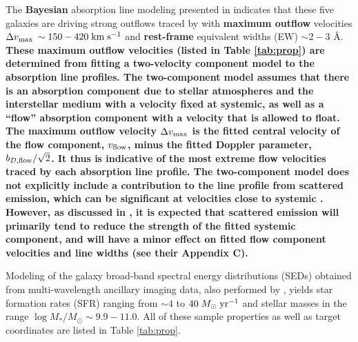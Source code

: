 \documentclass[trackchanges,twocolumn]{aastex62}
\def \mkms {{\rm \; km\;s^{-1}}}
\def \msunperyr {{\; M_{\odot}\rm \;yr^{-1}}}
\begin{document}
The \textbf{Bayesian} absorption line modeling presented in \cite{Rubin_2014} indicates that these five galaxies are driving strong outflows traced by  with \textbf{maximum outflow} velocities $\Delta v_{\rm max}$ $\sim150-420\mkms$ and \textbf{rest-frame} equivalent widths (EW) $\sim 2-3$ \AA. \textbf{These maximum outflow velocities (listed in Table \ref{tab:prop}) are determined from fitting a two-velocity component model to the absorption line profiles. The two-component model assumes that there is an absorption component due to stellar atmospheres and the interstellar medium with a velocity fixed at systemic, as well as a ``flow'' absorption component with a velocity that is allowed to float.  %
The maximum outflow velocity $\Delta v_{\rm max}$ is the fitted central velocity of the flow component, $v_{\rm flow}$, minus the fitted Doppler parameter, $b_{D,\rm flow}/\sqrt{2}$.  It thus is indicative of the most extreme flow velocities traced by each absorption line profile.
The two-component model does not explicitly include a contribution to the line profile from scattered emission, which
can be significant at velocities close to systemic \citep{Prochaska_2011}.  However, as discussed in \cite{Rubin_2014}, it is expected that scattered emission will primarily tend to reduce the strength of the fitted systemic component, and will have a minor effect on fitted flow component velocities and line widths (see their Appendix C).
} 

Modeling of the galaxy broad-band spectral energy distributions (SEDs) obtained from multi-wavelength ancillary imaging data, also performed by \cite{Rubin_2014}, yields star formation rates (SFR) ranging from $\sim4$ to $40\msunperyr$ and stellar masses in the range $\log M_*/M_{\odot}\sim 9.9-11.0$. All of these sample properties as well as target coordinates %
are listed in Table \ref{tab:prop}.
\end{document}
